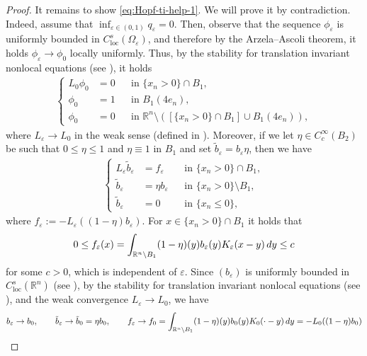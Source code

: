 \documentclass[11pt,reqno]{amsart}
\theoremstyle{plain}
\theoremstyle{definition}
\numberwithin{equation}{section}
\newcommand{\R}{\mathbb{R}}
\newcommand{\eps}{\varepsilon}
\newcommand{\loc}{\mathrm{loc}}
\newcommand{\1}{\mathbbm{1}}
\renewcommand{\d}{\textnormal{\,d}}
\begin{document}
\begin{proof}
It remains to show \eqref{eq:Hopf-ti-help-1}. We will prove it by contradiction. Indeed, assume that $\inf_{\eps \in (0,1)} q_{\eps} = 0$. Then, observe that the sequence $\phi_{\eps}$ is uniformly bounded in $C^s_{\mathrm{loc}}(\Omega_{\eps})$, and therefore by the Arzela--Ascoli theorem, it holds $\phi_{\eps} \to \phi_0$ locally uniformly. Thus, by the stability for translation invariant nonlocal equations (see \cite[Proposition 2.2.36]{FeRo24}), it holds
\begin{align*}
\left\{
\begin{aligned}
            L_{0} \phi_{0} &= 0 &&\text{in } \{ x_n > 0 \} \cap B_1,\\
            \phi_{0} &= 1 &&\text{in } B_{1}(4e_n),\\
            \phi_{0} & = 0 &&\text{in } \R^n \setminus ([\{ x_n > 0 \} \cap B_1] \cup B_{1}(4e_n)),
\end{aligned}
\right.
\end{align*}
where $L_{\eps} \to L_0$ in the weak sense (defined in \cite[Proof of Proposition 2.2.36]{FeRo24}). Moreover, if we let $\eta \in C_c^{\infty}(B_2)$ be such that $0 \le \eta \le 1$ and $\eta \equiv 1$ in $B_1$ and set $\tilde{b}_{\eps} = b_{\eps} \eta$, then we have 
\begin{align*}
\left\{
\begin{aligned}
        L_{\eps} \tilde{b}_{\eps} &= f_{\eps} &&\text{in } \{ x_n > 0 \} \cap B_1,\\
        \tilde{b}_{\eps} &= \eta b_{\eps} &&\text{in } \{ x_n > 0 \} \setminus B_1,\\
        \tilde{b}_{\eps} &= 0 &&\text{in } \{ x_n \le 0 \},
\end{aligned}
\right.
\end{align*}
where $f_\varepsilon:=-L_\varepsilon((1-\eta)b_\varepsilon)$. For $x \in \{ x_n > 0 \} \cap B_1$ it holds that
\begin{align*}
    0 \le f_{\eps}(x) = \int_{\R^n \setminus B_1} (1-\eta)(y) b_{\eps}(y) K_{\eps}(x-y) \d y \le c
\end{align*}
for some $c > 0$, which is independent of $\eps$. Since $(b_{\eps})$ is uniformly bounded in $C^s_{\loc}(\R^n)$ (see \cite[Lemma 5.1, Theorem 1.4]{RoWe24}), by the stability for translation invariant nonlocal equations (see \cite[Proposition 2.2.36]{FeRo24}), and the weak convergence $L_{\eps} \to L_0$, we have
\begin{align*}
    b_{\eps} \to b_0, \qquad \tilde{b}_{\eps} \to \tilde{b}_0 = \eta b_0, \qquad f_{\eps} \to f_0 = \int_{\R^n \setminus B_1} (1-\eta)(y) b_{0}(y) K_{0}(\cdot -y) \d y = -L_0((1-\eta) b_0)

\end{align*}
\end{proof}
\end{document}
